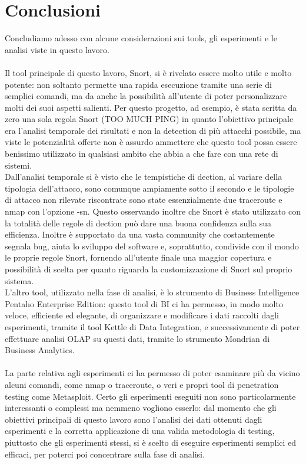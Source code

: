 \chapter*{Conclusioni}
Concludiamo adesso con alcune considerazioni sui tools, gli esperimenti e le analisi viste in questo lavoro.\\
\\
Il tool principale di questo lavoro, Snort, si è rivelato essere molto utile e molto potente: non soltanto permette una rapida esecuzione tramite una serie di semplici comandi, ma da anche la possibilità all'utente di poter personalizzare molti dei suoi aspetti salienti. Per questo progetto, ad esempio, è stata scritta da zero una sola regola Snort (TOO MUCH PING) in quanto l'obiettivo principale era l'analisi temporale dei risultati e non la detection di più attacchi possibile, ma viste le potenzialità offerte non è assurdo ammettere che questo tool possa essere benissimo utilizzato in qualsiasi ambito che abbia a che fare con una rete di sistemi.\\
Dall'analisi temporale si è visto che le tempistiche di dection, al variare della tipologia dell'attacco, sono comunque ampiamente sotto il secondo e le tipologie di attacco non rilevate riscontrate sono state essenzialmente due traceroute e nmap con l'opzione -sn. Questo osservando inoltre che Snort è stato utilizzato con la totalità delle regole di dection può dare una buona confidenza sulla sua efficienza. Inoltre è supportato da una vasta community che costantemente segnala bug, aiuta lo sviluppo del software e, soprattutto, condivide con il mondo le proprie regole Snort, fornendo all'utente finale una maggior copertura e possibilità di scelta per quanto riguarda la customizzazione di Snort sul proprio sistema.\\
L'altro tool, utilizzato nella fase di analisi, è lo strumento di Business Intelligence Pentaho Enterprise Edition: questo tool di BI ci ha permesso, in modo molto veloce, efficiente ed elegante, di organizzare e modificare i dati raccolti dagli esperimenti, tramite il tool Kettle di Data Integration, e successivamente di poter effettuare analisi OLAP su questi dati, tramite lo strumento Mondrian di Business Analytics.\\
\\
La parte relativa agli esperimenti ci ha permesso di poter esaminare più da vicino alcuni comandi, come nmap o traceroute, o veri e propri tool di penetration testing come Metasploit. Certo gli esperimenti eseguiti non sono particolarmente interessanti o complessi ma nemmeno vogliono esserlo: dal momento che gli obiettivi principali di questo lavoro sono l'analisi dei dati ottenuti dagli esperimenti e la corretta applicazione di una valida metodologia di testing, piuttosto che gli esperimenti stessi, si è scelto di eseguire esperimenti semplici ed efficaci, per poterci poi concentrare sulla fase di analisi.\\
